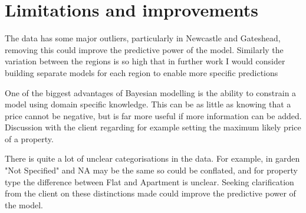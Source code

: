 \documentclass{scrartcl}
\begin{document}
\FloatBarrier
\section{Limitations and improvements} \label{limitations}
The data has some major outliers, particularly in Newcastle and Gateshead, removing this could improve the predictive power of the model. Similarly the variation between the regions is so high that in further work I would consider building separate models for each region to enable more specific predictions

One of the biggest advantages of Bayesian modelling is the ability to constrain a model using domain specific knowledge. This can be as little as knowing that a price cannot be negative, but is far more useful if more information can be added. Discussion with the client regarding for example setting the maximum likely price of a property.

There is quite a lot of unclear categorisations in the data. For example, in garden "Not Specified" and NA may be the same so could be conflated, and for property type the difference between Flat and Apartment is unclear. Seeking clarification from the client on these distinctions made could improve the predictive power of the model. 
\end{document}
